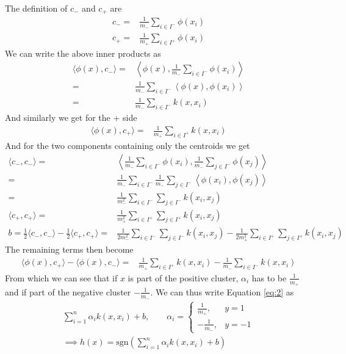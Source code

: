 \documentclass{article}
\begin{document}
The definition of $c_-$ and $c_+$ are
\begin{align}
	c_- =& \frac{1}{m_-}\sum_{i\in I^-}\phi(x_i)\\
	c_+ =& \frac{1}{m_+}\sum_{i\in I^+}\phi(x_i)
\end{align}
We can write the above inner products as 
\begin{align}
	\langle \phi(x), c_-\rangle =& \left\langle \phi(x), \frac{1}{m_-}\sum_{i\in I^-}\phi(x_i)\right\rangle\\
	=& \frac{1}{m_-}\sum_{i\in I^-}\left\langle \phi(x), \phi(x_i)\right\rangle\\
	=& \frac{1}{m_-}\sum_{i\in I^-}k(x,x_i)
\end{align}
And similarly we get for the + side
\begin{align}
	\langle \phi(x), c_+\rangle =& \frac{1}{m_+}\sum_{i\in I^+}k(x,x_i)
\end{align}
And for the two components containing only the centroids we get 
\begin{align}
	\langle c_-, c_-\rangle =& \left\langle \frac{1}{m_-}\sum_{i\in I^-}\phi(x_i), \frac{1}{m_-}\sum_{j\in I^-}\phi(x_j)\right\rangle\\
	=& \frac{1}{m_-}\sum_{i\in I^-}\frac{1}{m_-}\sum_{j\in I^-}\left\langle \phi(x_i), \phi(x_j)\right\rangle\\
	=& \frac{1}{m_-^2}\sum_{i\in I^-}\sum_{j\in I^-}k(x_i,x_j)\\
	\langle c_+, c_+\rangle =&\frac{1}{m_+^2}\sum_{i\in I^+}\sum_{j\in I^+}k(x_i,x_j) \\
	b = \frac{1}{2}\langle c_-, c_-\rangle - \frac{1}{2}\langle c_+, c_+\rangle =& \frac{1}{2m_-^2}\sum_{i\in I^-}\sum_{j\in I^-}k(x_i,x_j) - \frac{1}{2m_+^2}\sum_{i\in I^+}\sum_{j\in I^+}k(x_i,x_j)
\end{align}
The remaining terms then become
\begin{align}
	\langle \phi(x), c_+\rangle - \langle \phi(x), c_-\rangle =&\frac{1}{m_+}\sum_{i\in I^+}k(x,x_i) -  \frac{1}{m_-}\sum_{i\in I^-}k(x,x_i)
\end{align}
From which we can see that if $x$ is part of the positive cluster, $\alpha_i$ has to be $\frac{1}{m_+}$ and if part of the negative cluster $-\frac{1}{m_-}$. We can thus write Equation \ref{eq:2} as 
\begin{align}
	\sum_{i=1}^{n}\alpha_i k(x,x_i) + b, \qquad
	\alpha_i = \begin{cases}
		\frac{1}{m_+}, & y = 1\\
		-\frac{1}{m_-}, & y= -1
	\end{cases} \\
	\implies h(x) = \text{sgn}\left( \sum_{i=1}^{n}\alpha_i k(x,x_i) + b\right) 
\end{align}
\end{document}
